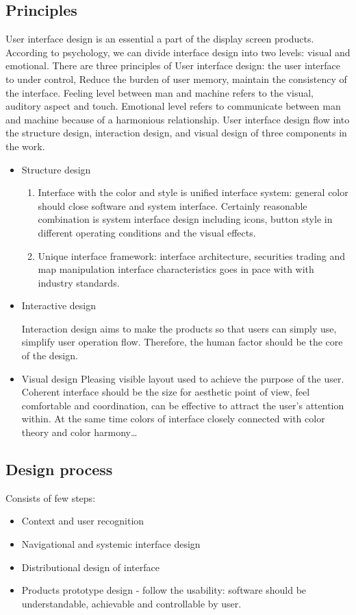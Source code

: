 \documentclass[10pt,twoside,english,a4paper]{article}
\begin{document}
\subsection{Principles} 
User interface design is an essential a part of the display screen products. According to psychology, we can divide interface design into two levels: visual and emotional. There are three principles of User interface design: the user interface to under control, Reduce the burden of user memory, maintain the consistency of the interface. Feeling level between man and machine refers to the visual, auditory aspect and touch. Emotional level refers to communicate between man and machine because of a harmonious relationship. User interface design flow into the structure design, interaction design, and visual design of three components in the work\cite{XiangqianFu2010}.

\begin{itemize}
\item Structure design
\begin{enumerate}

\item Interface with the color and style is unified interface system: general color should close software and system interface. Certainly reasonable combination is system interface design including icons, button style in different operating conditions and the visual effects.
\item Unique interface framework: interface architecture, securities trading and map manipulation interface characteristics goes in pace with with industry standards.
	\end{enumerate}
\item Interactive design

Interaction design aims to make the products so that users can simply use, simplify user operation flow. Therefore, the human factor should be the core of the design.

\item Visual design
Pleasing visible layout used to achieve the purpose of the user. Coherent interface should be the size for aesthetic point of view, feel comfortable and coordination, can be effective to attract the user's attention within. At the same time colors of interface closely connected with color theory and color harmony…
\end{itemize}

\subsection{Design process}
Consists of few steps: 
\begin{itemize}
\item         Context and user recognition
\item         Navigational and systemic interface design
\item        Distributional design of interface
\item Products prototype design - follow the usability: software should be understandable, achievable and controllable by user. \cite{XiangqianFu2010}
\end{itemize}
\end{document}
